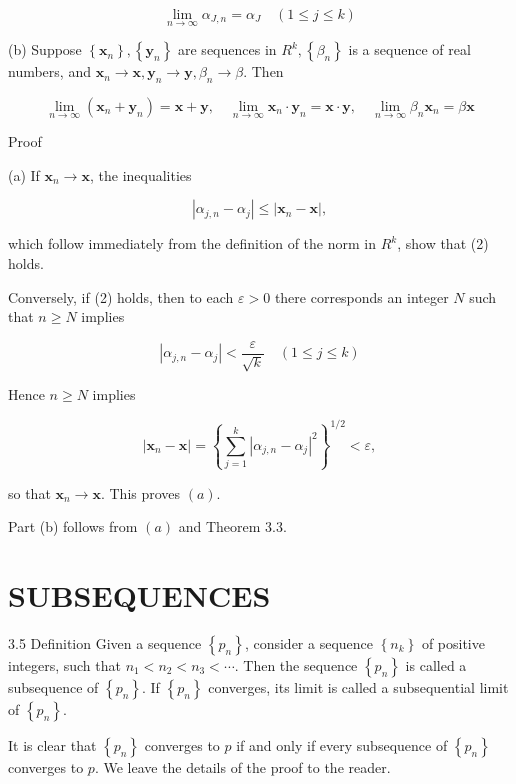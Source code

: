 \documentclass[10pt]{article}
\begin{document}
$$
\lim _{n \rightarrow \infty} \alpha_{J, n}=\alpha_{J} \quad(1 \leq j \leq k)
$$

(b) Suppose $\left\{\mathbf{x}_{n}\right\},\left\{\mathbf{y}_{n}\right\}$ are sequences in $R^{k},\left\{\beta_{n}\right\}$ is a sequence of real numbers, and $\mathbf{x}_{n} \rightarrow \mathbf{x}, \mathbf{y}_{n} \rightarrow \mathbf{y}, \beta_{n} \rightarrow \beta$. Then

$$
\lim _{n \rightarrow \infty}\left(\mathbf{x}_{n}+\mathbf{y}_{n}\right)=\mathbf{x}+\mathbf{y}, \quad \lim _{n \rightarrow \infty} \mathbf{x}_{n} \cdot \mathbf{y}_{n}=\mathbf{x} \cdot \mathbf{y}, \quad \lim _{n \rightarrow \infty} \beta_{n} \mathbf{x}_{n}=\beta \mathbf{x}
$$

Proof

(a) If $\mathbf{x}_{n} \rightarrow \mathbf{x}$, the inequalities

$$
\left|\alpha_{j, n}-\alpha_{j}\right| \leq\left|\mathbf{x}_{n}-\mathbf{x}\right|,
$$

which follow immediately from the definition of the norm in $R^{k}$, show that (2) holds.

Conversely, if (2) holds, then to each $\varepsilon>0$ there corresponds an integer $N$ such that $n \geq N$ implies

$$
\left|\alpha_{j, n}-\alpha_{j}\right|<\frac{\varepsilon}{\sqrt{k}} \quad(1 \leq j \leq k)
$$

Hence $n \geq N$ implies

$$
\left|\mathbf{x}_{n}-\mathbf{x}\right|=\left\{\sum_{j=1}^{k}\left|\alpha_{j, n}-\alpha_{j}\right|^{2}\right\}^{1 / 2}<\varepsilon,
$$

so that $\mathbf{x}_{n} \rightarrow \mathbf{x}$. This proves $(a)$.

Part (b) follows from $(a)$ and Theorem 3.3.

\section{SUBSEQUENCES}
3.5 Definition Given a sequence $\left\{p_{n}\right\}$, consider a sequence $\left\{n_{k}\right\}$ of positive integers, such that $n_{1}<n_{2}<n_{3}<\cdots$. Then the sequence $\left\{p_{n}\right\}$ is called a subsequence of $\left\{p_{n}\right\}$. If $\left\{p_{n}\right\}$ converges, its limit is called a subsequential limit of $\left\{p_{n}\right\}$.

It is clear that $\left\{p_{n}\right\}$ converges to $p$ if and only if every subsequence of $\left\{p_{n}\right\}$ converges to $p$. We leave the details of the proof to the reader.
\end{document}

